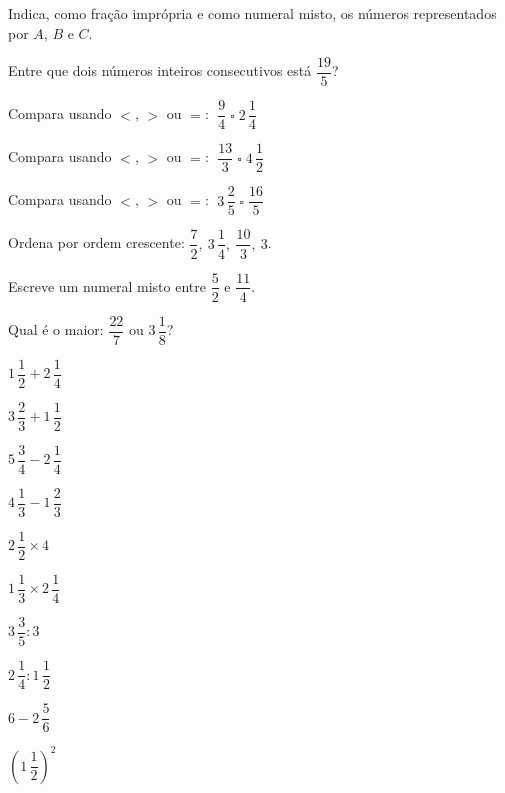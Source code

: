 \documentclass[12pt]{article}
\begin{document}

\begin{center}
\end{center}

\begin{exercicios}
  \item Indica, como fração imprópria e como numeral misto, os números representados por $A$, $B$ e $C$.
  \item Entre que dois números inteiros consecutivos está $\dfrac{19}{5}$?
  \item Compara usando $<$, $>$ ou $=$: $\;\dfrac{9}{4} \;\square\; 2\,\dfrac{1}{4}$
  \item Compara usando $<$, $>$ ou $=$: $\;\dfrac{13}{3} \;\square\; 4\,\dfrac{1}{2}$
  \item Compara usando $<$, $>$ ou $=$: $\;3\,\dfrac{2}{5} \;\square\; \dfrac{16}{5}$
  \item Ordena por ordem crescente: $\dfrac{7}{2},\ 3\,\dfrac{1}{4},\ \dfrac{10}{3},\ 3$.
  \item Escreve um numeral misto entre $\dfrac{5}{2}$ e $\dfrac{11}{4}$.
  \item Qual é o maior: $\dfrac{22}{7}$ ou $3\,\dfrac{1}{8}$?
\end{exercicios}

\begin{exercicios}
  \item $1\,\dfrac{1}{2} + 2\,\dfrac{1}{4}$
  \item $3\,\dfrac{2}{3} + 1\,\dfrac{1}{2}$
  \item $5\,\dfrac{3}{4} - 2\,\dfrac{1}{4}$
  \item $4\,\dfrac{1}{3} - 1\,\dfrac{2}{3}$
  \item $2\,\dfrac{1}{2} \times 4$
  \item $1\,\dfrac{1}{3} \times 2\,\dfrac{1}{4}$
  \item $3\,\dfrac{3}{5} : 3$
  \item $2\,\dfrac{1}{4} : 1\,\dfrac{1}{2}$
  \item $6 - 2\,\dfrac{5}{6}$
  \item $\left(1\,\dfrac{1}{2}\right)^2$
\end{exercicios}
\end{document}
